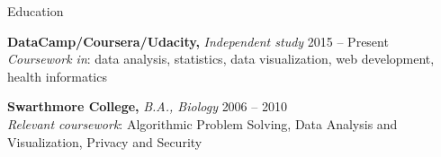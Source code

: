 \documentclass{resume} %
\begin{document}

\begin{rSection}{Education}
\vspace{0.3em}

{\bf DataCamp/Coursera/Udacity, }{\em Independent study} \hfill 2015 -- Present \\ 
{\em Coursework in}: data analysis, statistics, data visualization, web development, health informatics

{\bf Swarthmore College, }{\em B.A., Biology } \hfill 2006 -- 2010 \\
{\em Relevant coursework}: Algorithmic Problem Solving, Data Analysis and Visualization, Privacy and Security
\end{rSection}







\end{document}
